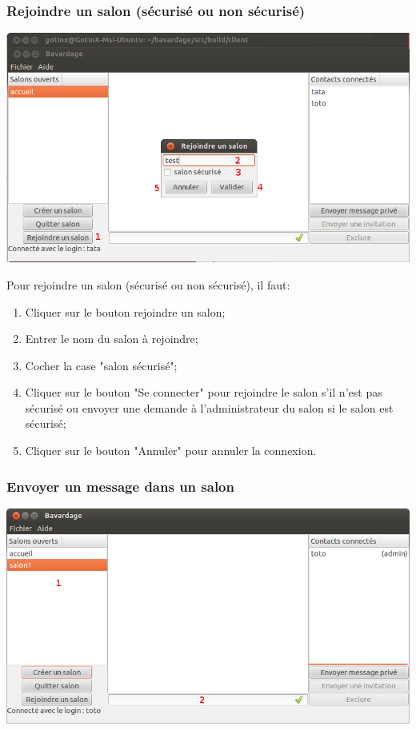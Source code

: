\documentclass[a4paper,11pt,french]{book}
\begin{document}
\subsubsection{Rejoindre un salon (sécurisé ou non sécurisé)}

\includegraphics[width=40em]{capture/rej_sal.png}

Pour rejoindre un salon (sécurisé ou non sécurisé), il faut:

\begin{enumerate}
    \item Cliquer sur le bouton rejoindre un salon;
    \item Entrer le nom du salon à rejoindre;
    \item Cocher la case "salon sécurisé";
    \item Cliquer sur le bouton "Se connecter" pour rejoindre le salon s'il n'est pas sécurisé ou envoyer une demande à l'administrateur du salon si le salon est sécurisé;
    \item Cliquer sur le bouton "Annuler" pour annuler la connexion.
\end{enumerate}
\newpage

\subsubsection{Envoyer un message dans un salon}

\includegraphics[width=40em]{capture/mess_room.png}
\end{document}
